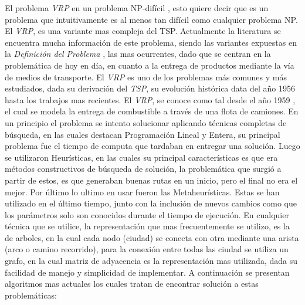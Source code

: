 \documentclass[letter, 10pt]{article}
\begin{document}
El problema \emph{VRP} en un problema NP-dif\'icil , esto quiere decir que es un problema que intuitivamente es al menos tan dif\'icil como cualquier 
problema NP. El \emph{VRP}, es una variante mas compleja del TSP.
\newline
Actualmente la literatura se encuentra mucha informaci\'on de este problema, siendo las variantes expuestas en la \emph{Definici\'on del Problema }, las mas ocurrentes, dado que se centran en la problem\'atica de hoy en d\'ia, en cuanto a la entrega de productos mediante la v\'ia de 
medios de transporte.
El \emph{VRP} es uno de los problemas m\'as comunes y m\'as estudiados, dada su derivaci\'on del \emph{TSP}, su evoluci\'on hist\'orica data del a\~no 1956 hasta los trabajos mas recientes. El \emph{VRP}, se conoce como tal desde el a\~no 1959 \cite{Ing3832}, el cual se modela la entrega de combustible a trav\'es de una flota de camiones.
\newline
En un principio el problema se intento solucionar aplicando t\'ecnicas completas de b\'usqueda, en las cuales destacan Programaci\'on Lineal y Entera, su principal problema fue el tiempo de computa que tardaban en entregar una soluci\'on\cite{Ing3832}. Luego se utilizaron Heur\'isticas, en las cuales su principal caracter\'isticas es que era m\'etodos constructivos de b\'usqueda de soluci\'on, la problem\'atica que surgi\'o a partir de estos, es que generaban buenas rutas en un inicio, pero el final no era el mejor\cite{Ing3832}. Por \'ultimo lo ultimo en usar fueron las Metaheur\'isticas. Estas se han utilizado en el \'ultimo tiempo, junto con la inclusi\'on de nuevos cambios como que los par\'ametros solo son conocidos durante el tiempo de ejecuci\'on\cite{Ing3832}.
\newline
En cualquier t\'ecnica que se utilice, la representaci\'on que mas frecuentemente se utilizo, es la de arboles, en la cual cada nodo
(ciudad) se conecta con otra mediante una arista (arco o camino recorrido), para la conexi\'on entre todas las ciudad se utiliza 
un grafo, en la cual matriz de adyacencia es la representaci\'on mas utilizada, dada su facilidad de manejo y simplicidad de
implementar.
A continuaci\'on se presentan algoritmos mas actuales los cuales tratan de encontrar soluci\'on a estas problem\'aticas:
\end{document}
